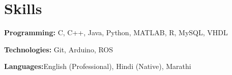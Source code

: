 \documentclass[letterpaper,11pt]{article}
\makeatletter
\newcommand{\resumeOrganizationHeading}[4]{
  \vspace{-2pt}\item
    \begin{tabular*}{0.97\textwidth}[t]{l@{\extracolsep{\fill}}r}
      \textbf{#1} & \textit{\small #2} \\
      \textit{\small#3}
    \end{tabular*}\vspace{-7pt}
}
\newcommand{\resumeSubHeadingListStart}{\begin{itemize}[leftmargin=0.15in, label={}]}
\newcommand{\resumeSubHeadingListEnd}{\end{itemize}}
\makeatother
\begin{document}
\section{Skills}
  \vspace{1pt}
  \resumeSubHeadingListStart
    \small{\item{
        \textbf{Programming:}{ C, C++, Java, Python, MATLAB, R, MySQL, VHDL} \\ \vspace{2pt}
        
        \textbf{Technologies:}{ Git, Arduino, ROS} \\ \vspace{2pt}
        
        \textbf{Languages:}{English (Professional), Hindi (Native), Marathi }
        
    }}
  \resumeSubHeadingListEnd




    
    




    
    



\end{document}
